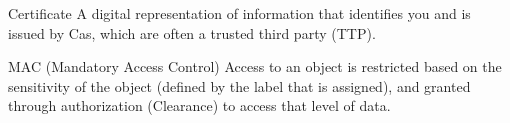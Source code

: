 \documentclass[avery5388,frame]
{flashcards}
\begin{document}
\begin{flashcard}[Security]{Certificate}
A digital representation of information that identifies you and is issued by Cas, which are often a trusted third party (TTP).
\end{flashcard}

\begin{flashcard}[Security]{MAC (Mandatory Access Control)}
Access to an object is restricted based on the sensitivity of the object (defined by the label that is assigned), and granted through authorization (Clearance) to access that level of data.
\end{flashcard}
\end{document}
